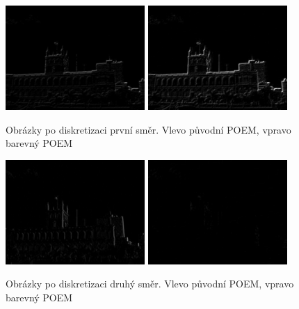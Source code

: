 \documentclass{report}
\begin{document}
\begin{figure}[H]
	\centering
	\includegraphics[width=150pt]{./img/aems0.jpg}
	\includegraphics[width=150pt]{./img/aems_3_0.jpg}
	\caption{Obrázky po diskretizaci první směr. Vlevo původní POEM, vpravo barevný POEM}
\end{figure}
\begin{figure}[H]
	\centering
	\includegraphics[width=150pt]{./img/aems1.jpg}
	\includegraphics[width=150pt]{./img/aems_3_1.jpg}
	\caption{Obrázky po diskretizaci druhý směr. Vlevo původní POEM, vpravo barevný POEM}
\end{figure}
\end{document}
